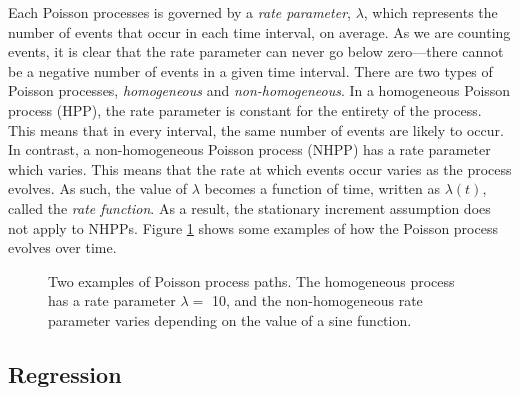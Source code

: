 \documentclass[a4paper,11pt]{article}
\begin{document}
   Each Poisson processes is governed by a \emph{rate parameter}, $\lambda$,
   which represents the number of events that occur in each time interval, on
   average. As we are counting events, it is clear that the rate parameter can
   never go below zero---there cannot be a negative number of events in a given
   time interval. There are two types of Poisson processes, \emph{homogeneous}
   and \emph{non-homogeneous}. In a homogeneous Poisson process (HPP), the rate
   parameter is constant for the entirety of the process. This means that in
   every interval, the same number of events are likely to occur. In contrast, a
   non-homogeneous Poisson process (NHPP) has a rate parameter which
   varies. This means that the rate at which events occur varies as the process
   evolves. As such, the value of $\lambda$ becomes a function of time, written
   as $\lambda(t)$, called the \emph{rate function}. As a result, the stationary
   increment assumption does not apply to NHPPs. Figure \ref{fig:poisson} shows
   some examples of how the Poisson process evolves over time.
   \begin{figure}
   \caption{Two examples of Poisson process paths. The homogeneous process has a
   rate parameter $\lambda=$ 10, and the non-homogeneous rate parameter varies
   depending on the value of a sine function.}
   \label{fig:poisson}
   \end{figure}
\subsection{Regression}
\label{sec-2-3}
\end{document}

